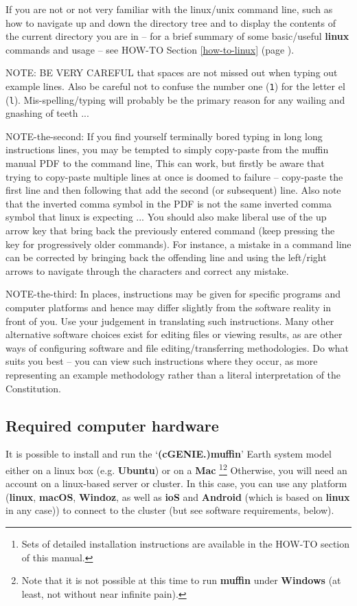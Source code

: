 \documentclass[11pt,fleqn]{book} %
\begin{document}
If you are not or not very familiar with the linux/unix command line, such as how to navigate up and down the directory tree and to display the contents of the current directory you are in – for a brief summary of some basic/useful \textbf{linux} commands and usage -- see HOW-TO Section \ref{how-to-linux} (page \pageref{how-to-linux}).

NOTE: BE VERY CAREFUL that spaces are not missed out when typing out example lines. Also be careful not to confuse the number one (\texttt{1}) for the letter el (\texttt{l}). Mis-spelling/typing will probably be the primary reason for any wailing and gnashing of teeth ...

NOTE-the-second: If you find yourself terminally bored typing in long long instructions lines, you may be tempted to simply copy-paste from the muffin manual PDF to the command line, This can work, but firstly be aware that trying to copy-paste multiple lines at once is doomed to failure -- copy-paste the first line and then following that add the second (or subsequent) line.
Also note that the inverted comma symbol in the PDF is not the same inverted comma symbol that linux is expecting ... You should also make liberal use of the up arrow key that bring back the previously entered command (keep pressing the key for progressively older commands). For instance, a mistake in a command line can be corrected by bringing back the offending line and using the left/right arrows to navigate through the characters and correct any mistake.

NOTE-the-third: In places, instructions may be given for specific programs and computer platforms and hence may differ slightly from the software reality in front of you. Use your judgement in translating such instructions. Many other alternative software choices exist for editing files or viewing results, as are other ways of configuring software and file editing/transferring methodologies. Do what suits you best – you can view such instructions where they occur, as  more representing an example methodology rather than a literal interpretation of the Constitution.


\subsection*{Required computer hardware}

It is  possible to install and run the ‘\textbf{(cGENIE.)muffin}’ Earth system model either on a linux box (e.g. \textbf{Ubuntu}) or on a \textbf{Mac} \footnote{Sets of detailed installation instructions are available in the HOW-TO section of this manual.}\footnote{Note that it is not possible at this time to run \textbf{muffin} under \textbf{Windows} (at least, not without near infinite pain).} Otherwise, you will need an account on a linux-based server or cluster. In this case, you can use any platform (\textbf{linux}, \textbf{macOS}, \textbf{Windoz}, as well as \textbf{ioS} and \textbf{Android} (which is based on \textbf{linux} in any case)) to connect to the cluster (but see software requirements, below).
\end{document}
